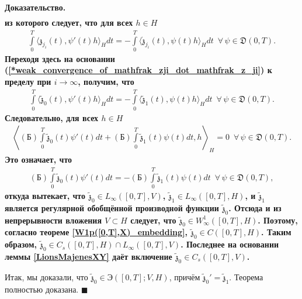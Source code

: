 \documentclass{report}
\newenvironment{Proof}{\par\noindent\bf Доказательство.\rm}{ $\blacksquare$\par}
\begin{document}
\begin{Proof}
\begin{gather*}
\end{gather*}
из которого следует, что для всех $h\in H$
\begin{gather*}
\int\limits_0^T\langle\mathfrak{z}_{j_i}(t),\psi'(t)h\rangle_H dt=-\int\limits_0^T\langle\dot{\mathfrak{z}}_{j_i}(t),\psi(t)h\rangle_H dt\,\,\,\forall\,\psi\in\mathfrak{D}(0,T).
\end{gather*}
Переходя здесь на основании (\ref{*weak_convergence_of_mathfrak_zji_dot_mathfrak_z_ji}) к пределу при $i\to\infty$, получим, что
\begin{gather*}
\int\limits_0^T\langle\tilde{\mathfrak{z}}_0(t),\psi'(t)h\rangle_H dt=-\int\limits_0^T\langle\tilde{\mathfrak{z}}_1(t),\psi(t)h\rangle_H dt\,\,\,\forall\,\psi\in\mathfrak{D}(0,T).
\end{gather*}
Следовательно, для всех $h\in H$
\begin{gather*}
\left\langle(\textrm{Б})\int\limits_0^T\tilde{\mathfrak{z}}_0(t)\psi'(t)dt+(\textrm{Б})\int\limits_0^T\tilde{\mathfrak{z}}_1(t)\psi(t)dt,h\right\rangle_H=0\,\,\,\forall\,\psi\in
\mathfrak{D}(0,T).
\end{gather*}
Это означает, что
\begin{gather*}
(\textrm{Б})\int\limits_0^T\tilde{\mathfrak{z}}_0(t)\psi'(t)dt=-(\textrm{Б})\int\limits_0^T\tilde{\mathfrak{z}}_1(t)\psi(t)dt\,\,\,\forall\,\psi\in\mathfrak{D}(0,T),
\end{gather*}
откуда вытекает, что $\tilde{\mathfrak{z}}_0\in L_\infty([0,T],V)$, $\tilde{\mathfrak{z}}_1\in L_\infty([0,T],H)$, и $\tilde{\mathfrak{z}}_1$ является регулярной обобщённой производной
функции $\tilde{\mathfrak{z}}_0$. Отсюда и из непрерывности вложения $V\subset H$ следует, что $\tilde{\mathfrak{z}}_0\in W^1_\infty([0,T],H)$. Поэтому, согласно теореме
\ref{W1p([0,T],X)_embedding}, $\tilde{\mathfrak{z}}_0\in C([0,T],H)$. Таким образом, $\tilde{\mathfrak{z}}_0\in C_s([0,T],H)\cap L_\infty([0,T],V)$. Последнее на
основании леммы \ref{LionsMajenesXY} даёт включение $\tilde{\mathfrak{z}}_0\in C_s([0,T],V)$.

Итак, мы доказали, что $\tilde{\mathfrak{z}}_0\in \textrm{Э}([0,T];V,H)$, причём $\tilde{\mathfrak{z}}_0'=\tilde{\mathfrak{z}}_1$. Теорема полностью доказана.
\end{Proof}
\end{document}
